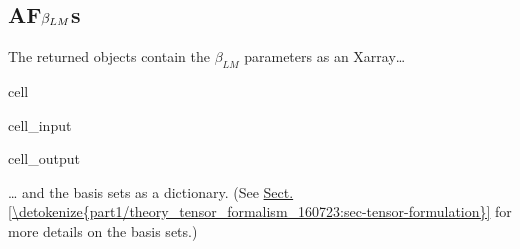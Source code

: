 \documentclass[letterpaper,table,10pt,english]{jupyterBook}
\begin{document}
\subsection{AF\sphinxhyphen{}\protect\(\beta_{LM}\protect\)s}
\label{\detokenize{part2/basic_fitting_numerics_intro_260723:af-beta-lm-s}}
\sphinxAtStartPar
The returned objects contain the \(\beta_{LM}\) parameters as an Xarray…

\begin{sphinxuseclass}{cell}\begin{sphinxVerbatimInput}

\begin{sphinxuseclass}{cell_input}
\begin{sphinxVerbatim}[commandchars=\\\{\}]
\end{sphinxVerbatim}

\end{sphinxuseclass}\end{sphinxVerbatimInput}
\begin{sphinxVerbatimOutput}

\begin{sphinxuseclass}{cell_output}
\noindent{}

\end{sphinxuseclass}\end{sphinxVerbatimOutput}

\end{sphinxuseclass}
\sphinxAtStartPar
… and the basis sets as a dictionary. (See \hyperref[\detokenize{part1/theory_tensor_formalism_160723:sec-tensor-formulation}]{Sect.\@ \ref{\detokenize{part1/theory_tensor_formalism_160723:sec-tensor-formulation}}} for more details on the basis sets.)
\end{document}
